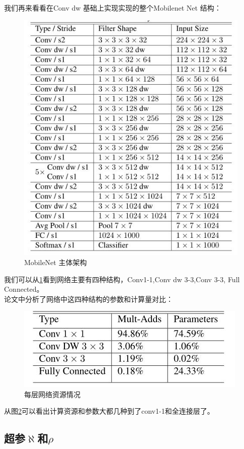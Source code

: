 \documentclass[UTF8,a4paper,12pt]{ctexart}
\begin{document}
我们再来看看在Conv dw 基础上实现实现的整个Mobilenet Net 结构：
\begin{figure}[htpb]
	\centering
	\includegraphics[width=0.5\linewidth]{webmin/netstr.jpg}
	\caption{MobileNet 主体架构}
	\label{fig-wangluojiegou}
\end{figure}
我们可以从\ref{fig-wangluojiegou}看到网络主要有四种结构，Conv1-1,Conv dw 3-3,Conv 3-3, Full Connected。\\
论文中分析了网络中这四种结构的参数和计算量对比：
\begin{figure}[htpb]
	\centering
	\includegraphics[width=0.5\linewidth]{webmin/计算量对比.jpg}
	\caption{每层网络资源情况}
	\label{fig-ziyuan}
\end{figure}

从图\ref{fig-ziyuan}可以看出计算资源和参数大都几种到了conv1-1和全连接层了。

\subsection{超参$\aleph$和$\rho$}\label{sec-chaocan}
\end{document}
